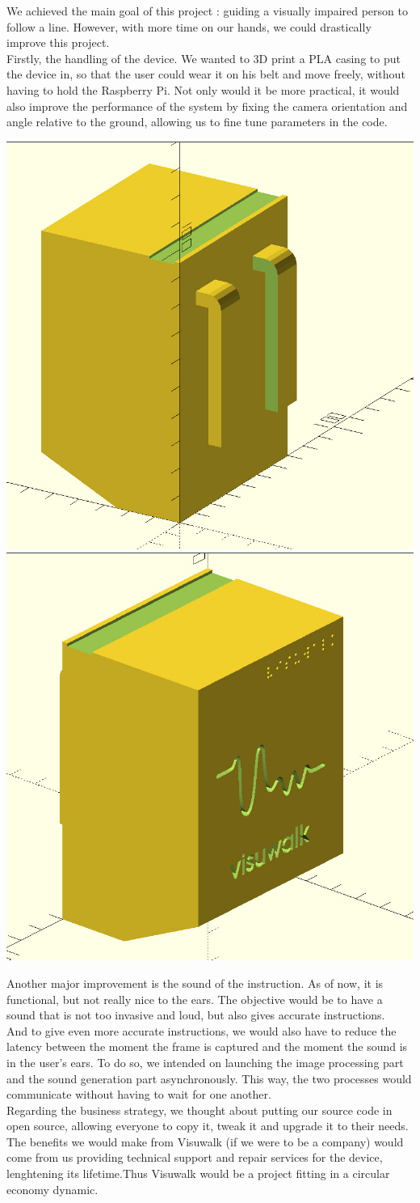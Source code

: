 \documentclass{rapport}
\begin{document}
We achieved the main goal of this project : guiding a visually impaired person to follow a line. However, with more time on our hands, we could drastically improve this project.\\
Firstly, the handling of the device. We wanted to 3D print a PLA casing to put the device in, so that the user could wear it on his belt and move freely, without having to hold the Raspberry Pi. Not only would it be more practical, it would also improve the performance of the system by fixing the camera orientation and angle relative to the ground, allowing us to fine tune parameters in the code.\\
\begin{center}
\includegraphics[width=0.2\linewidth]{visuwalk_case1.png}
\includegraphics[width=0.2\linewidth]{visuwalk_case2.png}
\end{center}
Another major improvement is the sound of the instruction. As of now, it is functional, but not really nice to the ears. The objective would be to have a sound that is not too invasive and loud, but also gives accurate instructions.\\
And to give even more accurate instructions, we would also have to reduce the latency between the moment the frame is captured and the moment the sound is in the user's ears. To do so, we intended on launching the image processing part and the sound generation part asynchronously. This way, the two processes would communicate without having to wait for one another.\\
Regarding the business strategy, we thought about putting our source code in open source, allowing everyone to copy it, tweak it and upgrade it to their needs. The benefits we would make from Visuwalk (if we were to be a company) would come from us providing technical support and repair services for the device, lenghtening its lifetime.Thus Visuwalk would be a project fitting in a circular economy dynamic.
\end{document}

